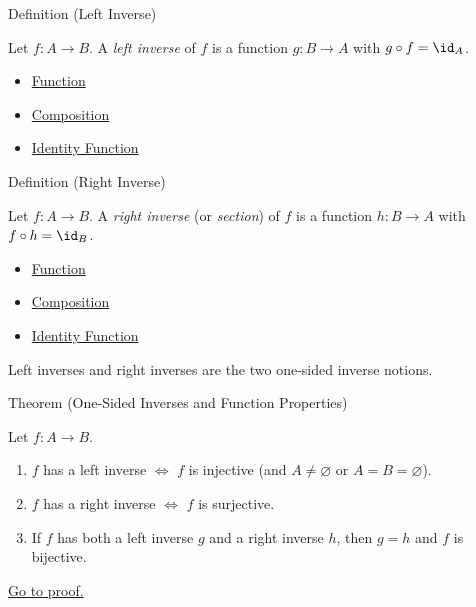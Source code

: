 \begin{definitionbox}{Definition (Left Inverse)}
\begin{definition}\label{def:left-inverse-function}
Let $f : A \to B$.
A \emph{left inverse} of $f$ is a function $g : B \to A$ with $g \circ f = \id_A$.
\end{definition}
\end{definitionbox}

\begin{dependencies}
\begin{itemize}
  \item \hyperref[def:function]{Function}
  \item \hyperref[def:composition]{Composition}
  \item \hyperref[def:identity]{Identity Function}
\end{itemize}
\end{dependencies}

\begin{definitionbox}{Definition (Right Inverse)}
\begin{definition}\label{def:right-inverse-function}
Let $f : A \to B$.
A \emph{right inverse} (or \emph{section}) of $f$ is a function $h : B \to A$
with $f \circ h = \id_B$.
\end{definition}
\end{definitionbox}

\begin{dependencies}
\begin{itemize}
  \item \hyperref[def:function]{Function}
  \item \hyperref[def:composition]{Composition}
  \item \hyperref[def:identity]{Identity Function}
\end{itemize}
\end{dependencies}

\begin{remark*}
Left inverses and right inverses are the two one-sided inverse notions.
\end{remark*}

\begin{theorembox}{Theorem (One-Sided Inverses and Function Properties)}
\begin{theorem}\label{thm:one-sided}
Let $f : A \to B$.
\begin{enumerate}[label=(\roman*)]
\item $f$ has a left inverse $\iff$ $f$ is injective (and $A \neq \varnothing$ or $A=B=\varnothing$).
\item $f$ has a right inverse $\iff$ $f$ is surjective.
\item If $f$ has both a left inverse $g$ and a right inverse $h$, then $g = h$
and $f$ is bijective.
\end{enumerate}
\hyperref[prf:one-sided]{Go to proof.}
\end{theorem}
\end{theorembox}

